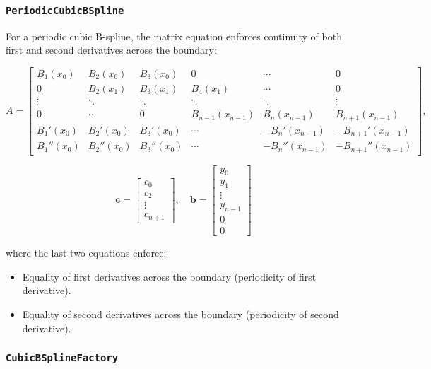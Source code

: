 \documentclass{article}
\begin{document}
\subsubsection{\texttt{PeriodicCubicBSpline}}
For a periodic cubic B-spline, the matrix equation enforces continuity of both first and second derivatives across the boundary:

\[
A = \begin{bmatrix}
B_1(x_0) & B_2(x_0) & B_3(x_0) & 0 & \cdots & 0 \\
0 & B_2(x_1) & B_3(x_1) & B_4(x_1) & \cdots & 0 \\
\vdots & \ddots & \ddots & \ddots & \ddots & \vdots \\
0 & \cdots & 0 & B_{n-1}(x_{n-1}) & B_n(x_{n-1}) & B_{n+1}(x_{n-1}) \\
B_1'(x_0) & B_2'(x_0) & B_3'(x_0) & \cdots & -B_n'(x_{n-1}) & -B_{n+1}'(x_{n-1}) \\
B_1''(x_0) & B_2''(x_0) & B_3''(x_0) & \cdots & -B_n''(x_{n-1}) & -B_{n+1}''(x_{n-1})
\end{bmatrix},
\]

\[
\mathbf{c} = \begin{bmatrix} c_0 \\ c_2 \\ \vdots \\ c_{n+1} \end{bmatrix}, \quad
\mathbf{b} = \begin{bmatrix} y_0 \\ y_1 \\ \vdots \\ y_{n-1} \\ 0 \\ 0 \end{bmatrix}
\]

where the last two equations enforce:
\begin{itemize}
  \item Equality of first derivatives across the boundary (periodicity of first derivative).
  \item Equality of second derivatives across the boundary (periodicity of second derivative).
\end{itemize}

\subsubsection{\texttt{CubicBSplineFactory}}
\end{document}
